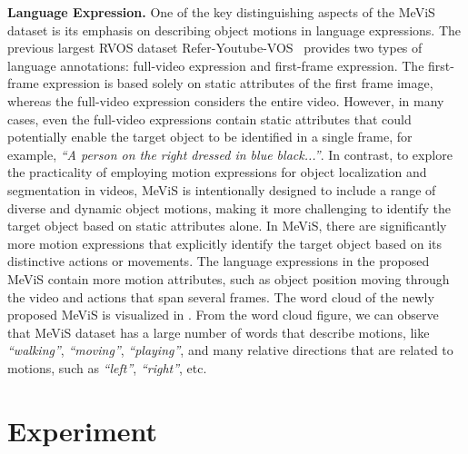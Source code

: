 \documentclass[10pt,twocolumn,letterpaper]{article}
\newcommand{\ourdataset}{MeViS\xspace}
\begin{document}
\begin{table*}[htbp]
\begin{minipage}[t]{1\textwidth}
\begin{minipage}[t]{0.4\textwidth}
  \vspace{-0.1in}
  \renewcommand\arraystretch{1.06}
   \end{minipage}
\end{minipage}
\vspace{-3.6mm}
\end{table*} 
\vspace{1mm}
\noindent\textbf{Language Expression.} 
One of the key distinguishing aspects of the \ourdataset dataset is its emphasis on describing object motions in language expressions. The previous largest RVOS dataset Refer-Youtube-VOS~\cite{seo2020urvos} provides two types of language annotations: full-video expression and first-frame expression. The first-frame expression is based solely on static attributes of the first frame image, whereas the full-video expression considers the entire video. However, in many cases, even the full-video expressions contain static attributes that could potentially enable the target object to be identified in a single frame, for example, \textit{``A person on the right dressed in {blue black}...''}. In contrast, to explore the practicality of employing motion expressions for object localization and segmentation in videos, \ourdataset is intentionally designed to include a range of diverse and dynamic object motions, making it more challenging to identify the target object based on static attributes alone. In \ourdataset, there are significantly more motion expressions that explicitly identify the target object based on its distinctive actions or movements. The language expressions in the proposed \ourdataset contain more motion attributes, such as object position moving through the video and actions that span several frames. The word cloud of the newly proposed \ourdataset is visualized in . From the word cloud figure, we can observe that \ourdataset dataset has a large number of words that describe motions, like \textit{``walking''}, \textit{``moving''}, \textit{``playing''}, and many relative directions that are related to motions, such as \textit{``left''}, \textit{``right''}, etc. \section{Experiment}
\end{document}
